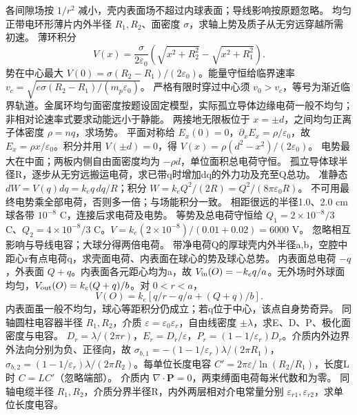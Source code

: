 \crosscheck 各间隙场按 $1/r^2$ 减小，壳内表面场不超过内球表面；导线影响按原题忽略。
\problemtext 均匀正带电环形薄片内外半径 $R_1,R_2$、面密度 $\sigma$，求轴上势及质子从无穷远穿越所需初速。
\workings 薄环积分
\[
V(x)=\frac{\sigma}{2\varepsilon_0}(\sqrt{x^2+R_2^2}-\sqrt{x^2+R_1^2}).
\]
势在中心最大 $V(0)=\sigma(R_2-R_1)/(2\varepsilon_0)$。能量守恒给临界速率 $v_c=\sqrt{e\sigma(R_2-R_1)/(m_p\varepsilon_0)}$。
\crosscheck 严格有限时穿过中心须 $v_0>v_c$，等号为渐近临界轨道。金属环均匀面密度按题设固定模型，实际孤立导体边缘电荷一般不均匀；非相对论速率式要求动能远小于静能。
\problemtext 两接地无限板位于 $x=\pm d$，之间均匀正离子体密度 $\rho=nq$，求场势。
\workings 平面对称给 $E_x(0)=0$，$\partial_xE_x=\rho/\varepsilon_0$，故 $E_x=\rho x/\varepsilon_0$。积分并用 $V(\pm d)=0$，得 $V(x)=\rho(d^2-x^2)/(2\varepsilon_0)$。
\crosscheck 电势最大在中面；两板内侧自由面密度均为 $-\rho d$，单位面积总电荷守恒。
\problemtext 孤立导体球半径R，逐步从无穷远搬运电荷，求已带q时增加dq的外力功及充至Q总功。
\workings 准静态 $dW=V(q)dq=k_eq\,dq/R$；积分 $W=k_eQ^2/(2R)=Q^2/(8\pi\varepsilon_0R)$。
\crosscheck 不可用最终电势乘全部电荷，否则多一倍；与场能积分一致。
\problemtext 相距很远的半径1.0、2.0 cm球各带 $10^{-8}$ C，连接后求电荷及电势。
\workings 等势及总电荷守恒给 $Q_1=2\times10^{-8}/3$ C、$Q_2=4\times10^{-8}/3$ C。$V=k_e(2\times10^{-8})/(0.01+0.02)=6000$ V。
\crosscheck 忽略相互影响与导线电容；大球分得两倍电荷。
\problemtext 带净电荷Q的厚球壳内外半径a,b，空腔中距心r有点电荷q，求壳面电荷、内表面在球心的势及球心总势。
\workings 内表面总电荷 $-q$，外表面 $Q+q$。内表面各元距心均为a，故 $V_{\rm in}(O)=-k_eq/a$。无外场时外球面均匀，$V_{\rm out}(O)=k_e(Q+q)/b$。对 $0<r<a$，
\[
V(O)=k_e[q/r-q/a+(Q+q)/b].
\]
\crosscheck 内表面虽一般不均匀，球心等距积分仍成立；若q位于中心，该点自身势奇异。
\problemtext 同轴圆柱电容器半径 $R_1,R_2$，介质 $\varepsilon=\varepsilon_0\varepsilon_r$，自由线密度 $\pm\lambda$，求E、D、P、极化面密度与电容。
\workings $D_r=\lambda/(2\pi r)$，$E_r=D_r/\varepsilon$，$P_r=(1-1/\varepsilon_r)D_r$。介质内外边界外法向分别为负、正径向，故 $\sigma_{b,1}=-(1-1/\varepsilon_r)\lambda/(2\pi R_1)$，$\sigma_{b,2}=(1-1/\varepsilon_r)\lambda/(2\pi R_2)$。每单位长度电容 $C'=2\pi\varepsilon/\ln(R_2/R_1)$，长度L时 $C=LC'$（忽略端部）。
\crosscheck 介质内 $\nabla\cdot\bm P=0$，两束缚面电荷每米代数和为零。
\problemtext 同轴电缆半径 $R_1,R_2$，介质分界半径R，内外两层相对介电常量分别 $\varepsilon_{r1},\varepsilon_{r2}$，求单位长度电容。
